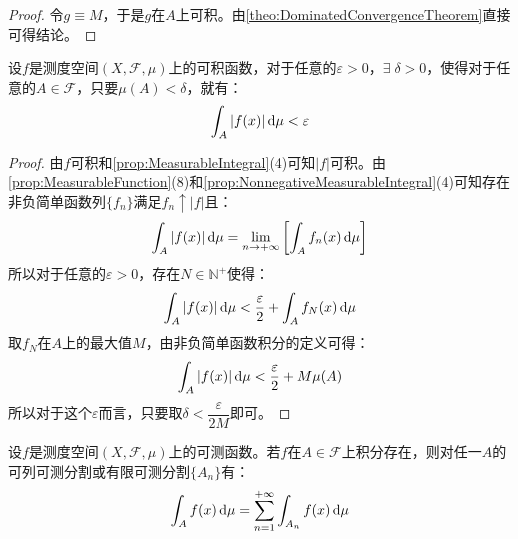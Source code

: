 \begin{proof}
	令$g\equiv M$，于是$g$在$A$上可积。由\cref{theo:DominatedConvergenceTheorem}直接可得结论。
\end{proof}
\begin{theorem}[积分的绝对连续性]
	设$f$是测度空间$(X,\mathscr{F},\mu)$上的可积函数，对于任意的$\varepsilon>0$，$\exists\;\delta>0$，使得对于任意的$A\in\mathscr{F}$，只要$\mu(A)<\delta$，就有：
	\begin{equation*}
		\int_{A}|f(x)|\mathop{}\!\mathrm{d}\mu<\varepsilon
	\end{equation*}
\end{theorem}
\begin{proof}
	由$f$可积和\cref{prop:MeasurableIntegral}(4)可知$|f|$可积。由\cref{prop:MeasurableFunction}(8)和\cref{prop:NonnegativeMeasurableIntegral}(4)可知存在非负简单函数列$\{f_n\}$满足$f_n\uparrow |f|$且：
	\begin{equation*}
		\int_{A}|f(x)|\mathop{}\!\mathrm{d}\mu=\lim_{n\to+\infty}\left[\int_{A}f_n(x)\mathop{}\!\mathrm{d}\mu\right]
	\end{equation*}
	所以对于任意的$\varepsilon>0$，存在$N\in\mathbb{N}^+$使得：
	\begin{equation*}
		\int_{A}|f(x)|\mathop{}\!\mathrm{d}\mu<\frac{\varepsilon}{2}+\int_{A}f_N(x)\mathop{}\!\mathrm{d}\mu
	\end{equation*}
	取$f_N$在$A$上的最大值$M$，由非负简单函数积分的定义可得：
	\begin{equation*}
		\int_{A}|f(x)|\mathop{}\!\mathrm{d}\mu<\frac{\varepsilon}{2}+M\mu(A)
	\end{equation*}
	所以对于这个$\varepsilon$而言，只要取$\delta<\dfrac{\varepsilon}{2M}$即可。
\end{proof}
\begin{theorem}\label{theo:MeasurableCountableIntegral}
	设$f$是测度空间$(X,\mathscr{F},\mu)$上的可测函数。若$f$在$A\in\mathscr{F}$上积分存在，则对任一$A$的可列可测分割或有限可测分割$\{A_n\}$有：
	\begin{equation*}
		\int_{A}f(x)\mathop{}\!\mathrm{d}\mu=\sum_{n=1}^{+\infty}\int_{A_n}f(x)\mathop{}\!\mathrm{d}\mu
	\end{equation*}
\end{theorem}
